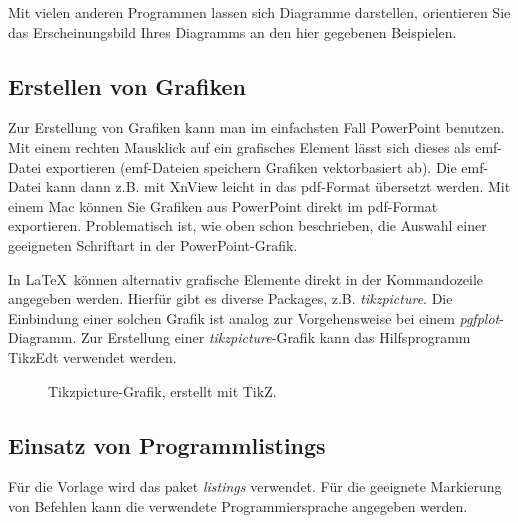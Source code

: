 Mit vielen anderen Programmen lassen sich Diagramme darstellen, orientieren Sie das Erscheinungsbild Ihres Diagramms an den hier gegebenen Beispielen.



\subsection{Erstellen von Grafiken}

Zur Erstellung von Grafiken kann man im einfachsten Fall PowerPoint benutzen. Mit einem rechten Mausklick auf ein grafisches Element lässt sich dieses als emf-Datei exportieren (emf-Dateien speichern Grafiken vektorbasiert ab). Die emf-Datei kann dann z.B. mit XnView leicht in das pdf-Format übersetzt werden. Mit einem Mac können Sie Grafiken aus PowerPoint direkt im pdf-Format exportieren. Problematisch ist, wie oben schon beschrieben, die Auswahl einer geeigneten Schriftart in der PowerPoint-Grafik.

In \LaTeX~können alternativ grafische Elemente direkt in der Kommandozeile angegeben werden. Hierfür gibt es diverse Packages, z.B. \textit{tikzpicture}. Die Einbindung einer solchen Grafik ist analog zur Vorgehensweise bei einem \textit{pgfplot}-Diagramm. Zur Erstellung einer  \textit{tikzpicture}-Grafik kann das Hilfsprogramm TikzEdt verwendet werden.

\begin{figure}[hbt]
	\centering
%	
	\caption[Tikzpicture Grafik]{Tikzpicture-Grafik, erstellt mit TikZ.}
	\label{fig:le_block_p}
\end{figure}

\subsection{Einsatz von Programmlistings}
Für die Vorlage wird das paket \textit{listings} verwendet. Für die geeignete Markierung von Befehlen kann die verwendete Programmiersprache angegeben werden.



